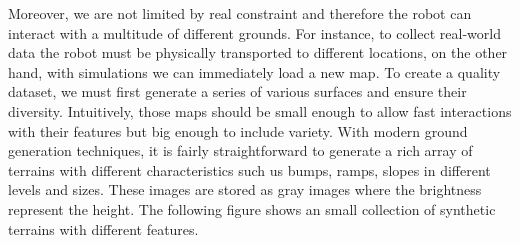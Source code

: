 \documentclass[../document.tex]{subfiles}
\begin{document}
Moreover, we are not limited by real constraint and therefore the robot can interact with a multitude of different grounds. For instance, to collect real-world data the robot must be physically transported to different locations, on the other hand, with simulations we can immediately load a new map.
To create a quality dataset, we must first generate a series of various surfaces and ensure their diversity. Intuitively, those maps should be small enough to allow fast interactions with their features but big enough to include variety. With modern ground generation techniques, it is fairly straightforward to generate a rich array of terrains with different characteristics such us bumps, ramps, slopes in different levels and sizes. These images are stored as gray images where the brightness represent the height. The following figure shows an small collection of synthetic terrains with different features.
\end{document}
